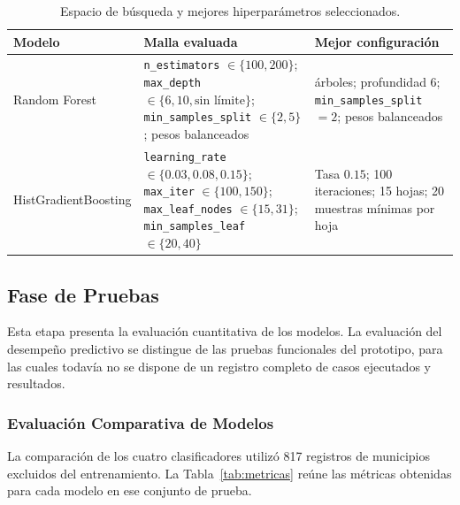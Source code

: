 \documentclass[12pt]{article}
\begin{document}
\begin{table}[H]
\centering
\footnotesize
\setlength{\tabcolsep}{4pt}
\caption{Espacio de búsqueda y mejores hiperparámetros seleccionados.}
\label{tab:tuning}
\begin{tabular}{@{}>{\raggedright\arraybackslash}p{3.5cm}
                    >{\raggedright\arraybackslash}p{6.5cm}
                    >{\raggedright\arraybackslash}p{4.1cm}@{}}
\toprule
\textbf{Modelo} & \textbf{Malla evaluada} & \textbf{Mejor configuración} \\
\midrule
Random Forest &
\texttt{n\_estimators} $\in\{100,200\}$; \texttt{max\_depth} $\in\{6,10,\text{sin límite}\}$; \texttt{min\_samples\_split} $\in\{2,5\}$; pesos balanceados &
200 árboles; profundidad 6; \texttt{min\_samples\_split} $=2$; pesos balanceados \\
\midrule
HistGradientBoosting &
\texttt{learning\_rate} $\in\{0.03,0.08,0.15\}$; \texttt{max\_iter} $\in\{100,150\}$; \texttt{max\_leaf\_nodes} $\in\{15,31\}$; \texttt{min\_samples\_leaf} $\in\{20,40\}$ &
Tasa $0.15$; 100 iteraciones; 15 hojas; 20 muestras mínimas por hoja \\
\bottomrule
\end{tabular}
\end{table}

\subsection{Fase de Pruebas}
Esta etapa presenta la evaluación cuantitativa de los modelos. La evaluación del desempeño predictivo se distingue de las pruebas funcionales del prototipo, para las cuales todavía no se dispone de un registro completo de casos ejecutados y resultados.

\subsubsection{Evaluación Comparativa de Modelos}
La comparación de los cuatro clasificadores utilizó 817 registros de municipios excluidos del entrenamiento. La Tabla~\ref{tab:metricas} reúne las métricas obtenidas para cada modelo en ese conjunto de prueba.
\end{document}
